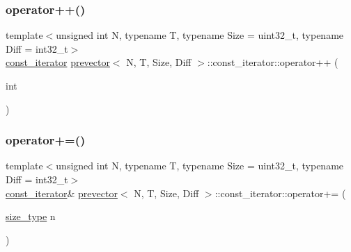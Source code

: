 \subsubsection{\texorpdfstring{operator++()}{operator++()}\hspace{0.1cm}{\footnotesize\ttfamily [2/2]}}
{\footnotesize\ttfamily template$<$unsigned int N, typename T, typename Size = uint32\+\_\+t, typename Diff = int32\+\_\+t$>$ \\
\mbox{\hyperlink{classprevector_1_1const__iterator}{const\+\_\+iterator}} \mbox{\hyperlink{classprevector}{prevector}}$<$ N, T, Size, Diff $>$\+::const\+\_\+iterator\+::operator++ (\begin{DoxyParamCaption}\item[{int}]{ }\end{DoxyParamCaption})\hspace{0.3cm}{\ttfamily [inline]}}

\mbox{\label{classprevector_1_1const__iterator_aca88910a8198d46d24bea84d39a6f07f}} 
\subsubsection{\texorpdfstring{operator+=()}{operator+=()}}
{\footnotesize\ttfamily template$<$unsigned int N, typename T, typename Size = uint32\+\_\+t, typename Diff = int32\+\_\+t$>$ \\
\mbox{\hyperlink{classprevector_1_1const__iterator}{const\+\_\+iterator}}\& \mbox{\hyperlink{classprevector}{prevector}}$<$ N, T, Size, Diff $>$\+::const\+\_\+iterator\+::operator+= (\begin{DoxyParamCaption}\item[{\mbox{\hyperlink{classprevector_a7e0da95e6d1c878f6eeb572f4fc12524}{size\+\_\+type}}}]{n }\end{DoxyParamCaption})\hspace{0.3cm}{\ttfamily [inline]}}

\mbox{\label{classprevector_1_1const__iterator_a73e83a22f94bc5b9c48f25ef0bd27ce3}} 
